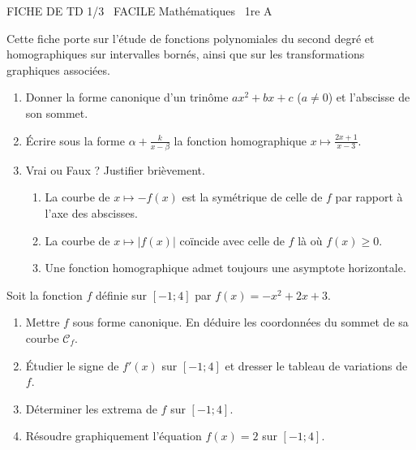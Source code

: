 \documentclass[11pt]{article}
\begin{document}
\begin{tcolorbox}[enhanced,colback=popink,colframe=popink,arc=10pt,boxrule=0pt,left=12pt,right=12pt,top=9pt,bottom=9pt]
{\color{white}\popxbold\small FICHE DE TD 1/3 \textbullet\ FACILE \hfill Mathématiques \textbullet\ 1re A\par}
\end{tcolorbox}
\vspace{4pt}
Cette fiche porte sur l'étude de fonctions polynomiales du second degré et homographiques sur intervalles bornés, ainsi que sur les transformations graphiques associées.

\begin{exercice}
\begin{enumerate}
    \item Donner la forme canonique d'un trinôme $ax^2+bx+c$ ($a \neq 0$) et l'abscisse de son sommet.
    \item Écrire sous la forme $\alpha + \frac{k}{x-\beta}$ la fonction homographique $x \mapsto \frac{2x+1}{x-3}$.
    \item Vrai ou Faux ? Justifier brièvement.
    \begin{enumerate}
        \item La courbe de $x \mapsto -f(x)$ est la symétrique de celle de $f$ par rapport à l'axe des abscisses.
        \item La courbe de $x \mapsto |f(x)|$ coïncide avec celle de $f$ là où $f(x) \geq 0$.
        \item Une fonction homographique admet toujours une asymptote horizontale.
    \end{enumerate}
\end{enumerate}
\end{exercice}

\begin{exercice}
Soit la fonction $f$ définie sur $[-1 ; 4]$ par $f(x) = -x^2 + 2x + 3$.
\begin{enumerate}
    \item Mettre $f$ sous forme canonique. En déduire les coordonnées du sommet de sa courbe $\mathcal{C}_f$.
    \item Étudier le signe de $f'(x)$ sur $[-1 ; 4]$ et dresser le tableau de variations de $f$.
    \item Déterminer les extrema de $f$ sur $[-1 ; 4]$.
    \item Résoudre graphiquement l'équation $f(x) = 2$ sur $[-1 ; 4]$.
\end{enumerate}
\end{exercice}
\end{document}

